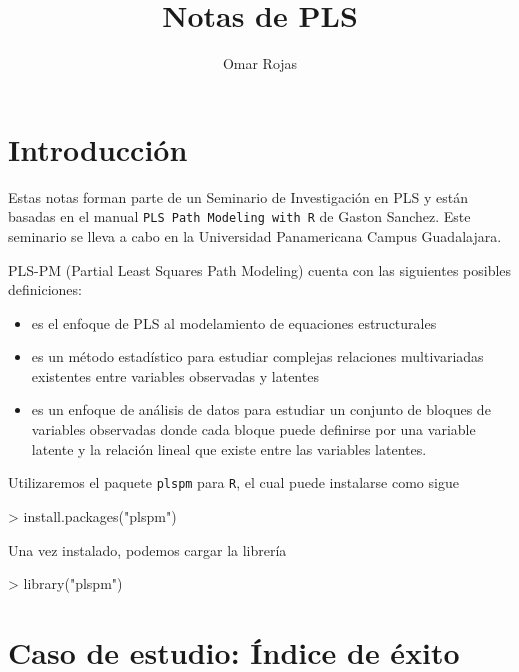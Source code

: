 \documentclass{paper}
\title{Notas de PLS}
\author{Omar Rojas}
\begin{document}


\maketitle

\section{Introducci\'on}

Estas notas forman parte de un Seminario de Investigaci\'on en PLS y est\'an basadas en el manual \texttt{PLS Path Modeling with R} de Gaston Sanchez. Este seminario se lleva a cabo en la Universidad Panamericana Campus Guadalajara. 

PLS-PM (Partial Least Squares Path Modeling) cuenta con las siguientes posibles definiciones:
\begin{itemize}
  \item es el enfoque de PLS al modelamiento de equaciones estructurales
  \item es un m\'etodo estad\'istico para estudiar complejas relaciones multivariadas existentes entre variables observadas y latentes
  \item es un enfoque de an\'alisis de datos para estudiar un conjunto de bloques de variables observadas donde cada bloque puede definirse por una variable latente y la relaci\'on lineal que existe entre las variables latentes.
\end{itemize}

Utilizaremos el paquete \texttt{plspm} para \texttt{R}, el cual puede instalarse como sigue
\begin{Schunk}
\begin{Sinput}
> install.packages("plspm")
\end{Sinput}
\end{Schunk}
Una vez instalado, podemos cargar la librer\'ia
\begin{Schunk}
\begin{Sinput}
> library("plspm")
\end{Sinput}
\end{Schunk}

\section{Caso de estudio: \'Indice de \'exito}
\end{document}
